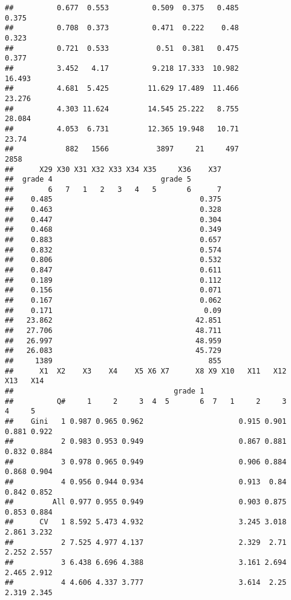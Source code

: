 \documentclass[
]{article}
\begin{document}
\begin{verbatim}
##          0.677  0.553          0.509  0.375   0.485                      0.375
##          0.708  0.373          0.471  0.222    0.48                      0.323
##          0.721  0.533           0.51  0.381   0.475                      0.377
##          3.452   4.17          9.218 17.333  10.982                     16.493
##          4.681  5.425         11.629 17.489  11.466                     23.276
##          4.303 11.624         14.545 25.222   8.755                     28.084
##          4.053  6.731         12.365 19.948   10.71                      23.74
##            882   1566           3897     21     497                       2858
##      X29 X30 X31 X32 X33 X34 X35     X36    X37
##  grade 4                         grade 5       
##        6   7   1   2   3   4   5       6      7
##    0.485                                  0.375
##    0.463                                  0.328
##    0.447                                  0.304
##    0.468                                  0.349
##    0.883                                  0.657
##    0.832                                  0.574
##    0.806                                  0.532
##    0.847                                  0.611
##    0.189                                  0.112
##    0.156                                  0.071
##    0.167                                  0.062
##    0.171                                   0.09
##   23.862                                 42.851
##   27.706                                 48.711
##   26.997                                 48.959
##   26.083                                 45.729
##     1389                                    855
##      X1  X2    X3    X4    X5 X6 X7      X8 X9 X10   X11   X12   X13   X14
##                                     grade 1                               
##          Q#     1     2     3  4  5       6  7   1     2     3     4     5
##    Gini   1 0.987 0.965 0.962                      0.915 0.901 0.881 0.922
##           2 0.983 0.953 0.949                      0.867 0.881 0.832 0.884
##           3 0.978 0.965 0.949                      0.906 0.884 0.868 0.904
##           4 0.956 0.944 0.934                      0.913  0.84 0.842 0.852
##         All 0.977 0.955 0.949                      0.903 0.875 0.853 0.884
##      CV   1 8.592 5.473 4.932                      3.245 3.018 2.861 3.232
##           2 7.525 4.977 4.137                      2.329  2.71 2.252 2.557
##           3 6.438 6.696 4.388                      3.161 2.694 2.465 2.912
##           4 4.606 4.337 3.777                      3.614  2.25 2.319 2.345

\end{verbatim}
\end{document}
